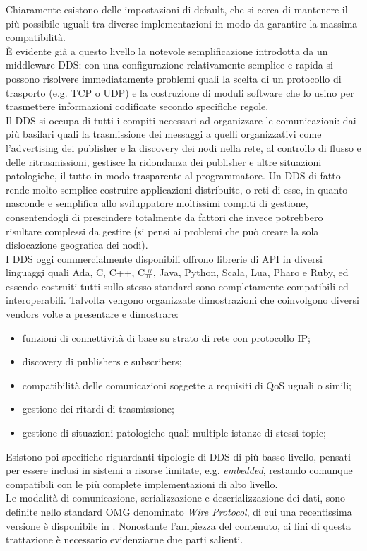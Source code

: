 Chiaramente esistono delle impostazioni di default, che si cerca di mantenere il più possibile uguali tra diverse implementazioni in modo da garantire la massima compatibilità.\\
È evidente già a questo livello la notevole semplificazione introdotta da un middleware DDS: con una configurazione relativamente semplice e rapida si possono risolvere immediatamente problemi quali la scelta di un protocollo di trasporto (e.g. TCP o UDP) e la costruzione di moduli software che lo usino per trasmettere informazioni codificate secondo specifiche regole.\\
Il DDS si occupa di tutti i compiti necessari ad organizzare le comunicazioni: dai più basilari quali la trasmissione dei messaggi a quelli organizzativi come l’advertising dei publisher e la discovery dei nodi nella rete, al controllo di flusso e delle ritrasmissioni, gestisce la ridondanza dei publisher e altre situazioni patologiche, il tutto in modo trasparente al programmatore. Un DDS di fatto rende molto semplice costruire applicazioni distribuite, o reti di esse, in quanto nasconde e semplifica allo sviluppatore moltissimi compiti di gestione, consentendogli di prescindere totalmente da fattori che invece potrebbero risultare complessi da gestire (si pensi ai problemi che può creare la sola dislocazione geografica dei nodi).\\
I DDS oggi commercialmente disponibili offrono librerie di API in diversi linguaggi quali  Ada, C, C++, C\#, Java, Python, Scala, Lua, Pharo e Ruby, ed essendo costruiti tutti sullo stesso standard sono completamente compatibili ed interoperabili. Talvolta vengono organizzate dimostrazioni che coinvolgono diversi vendors volte a presentare e dimostrare:
\begin{itemize}
    \item funzioni di connettività di base su strato di rete con protocollo IP;
    \item discovery di publishers e subscribers;
    \item compatibilità delle comunicazioni soggette a requisiti di QoS uguali o simili;
    \item gestione dei ritardi di trasmissione;
    \item gestione di situazioni patologiche quali multiple istanze di stessi topic;
\end{itemize}
Esistono poi specifiche riguardanti tipologie di DDS di più basso livello, pensati per essere inclusi in sistemi a risorse limitate, e.g. \emph{embedded}, restando comunque compatibili con le più complete implementazioni di alto livello.\\
Le modalità di comunicazione, serializzazione e deserializzazione dei dati, sono definite nello standard OMG denominato \emph{Wire Protocol}, di cui una recentissima versione è disponibile in \cite{wire}. Nonostante l'ampiezza del contenuto, ai fini di questa trattazione è necessario evidenziarne due parti salienti.


